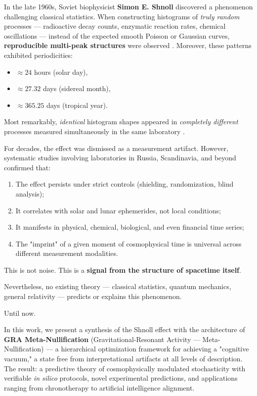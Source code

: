 \documentclass[12pt,a4paper]{article}
\theoremstyle{plain}
\theoremstyle{definition}
\theoremstyle{remark}
\begin{document}
In the late 1960s, Soviet biophysicist \textbf{Simon E. Shnoll} discovered a phenomenon challenging classical statistics. When constructing histograms of \emph{truly random} processes --- radioactive decay counts, enzymatic reaction rates, chemical oscillations --- instead of the expected smooth Poisson or Gaussian curves, \textbf{reproducible multi-peak structures} were observed \cite{shnoll2009patterns}. Moreover, these patterns exhibited periodicities:
\begin{itemize}
    \item $\approx 24$ hours (solar day),
    \item $\approx 27.32$ days (sidereal month),
    \item $\approx 365.25$ days (tropical year).
\end{itemize}
Most remarkably, \emph{identical} histogram shapes appeared in \emph{completely different} processes measured simultaneously in the same laboratory \cite{rubin2004cosmophysical}.

For decades, the effect was dismissed as a measurement artifact. However, systematic studies involving laboratories in Russia, Scandinavia, and beyond confirmed that:
\begin{enumerate}
    \item The effect persists under strict controls (shielding, randomization, blind analysis);
    \item It correlates with solar and lunar ephemerides, not local conditions;
    \item It manifests in physical, chemical, biological, and even financial time series;
    \item The "imprint" of a given moment of cosmophysical time is universal across different measurement modalities.
\end{enumerate}

This is not noise. This is a \textbf{signal from the structure of spacetime itself}.

Nevertheless, no existing theory --- classical statistics, quantum mechanics, general relativity --- predicts or explains this phenomenon.

Until now.

In this work, we present a synthesis of the Shnoll effect with the architecture of \textbf{GRA Meta-Nullification} (Gravitational-Resonant Activity --- Meta-Nullification) --- a hierarchical optimization framework for achieving a "cognitive vacuum," a state free from interpretational artifacts at all levels of description. The result: a predictive theory of cosmophysically modulated stochasticity with verifiable \textit{in silico} protocols, novel experimental predictions, and applications ranging from chronotherapy to artificial intelligence alignment.
\end{document}
